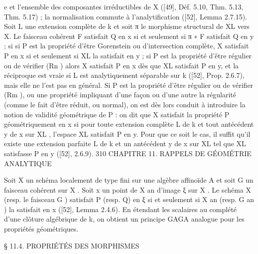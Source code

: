 \documentclass[
  10pt,
]{article}
\newenvironment{Shaded}{}{}
\newcommand{\NormalTok}[1]{#1}
\begin{document}
\begin{Shaded}
\begin{Highlighting}[]
\NormalTok{                                e et l’ensemble des composantes irréductibles de X ([49],}
\NormalTok{Déf. 5.10, Thm. 5.13, Thm. 5.17) ; la normalisation commute à l’analytification ([52],}
\NormalTok{Lemma 2.7.15).}
\NormalTok{   Soit L une extension complète de k et soit π le morphisme structural de XL vers X.}
\NormalTok{Le faisceau cohérent F satisfait Q en x si et seulement si π ∗ F satisfait Q en y ; si si}
\NormalTok{P est la propriété d’être Gorenstein ou d’intersection complète, X satisfait P en x si et}
\NormalTok{seulement si XL la satisfait en y ; si P est la propriété d’être régulier ou de vérifier (Rn )}
\NormalTok{alors X satisfait P en x dès que XL satisfait P en y, et la réciproque est vraie si L est}
\NormalTok{analytiquement séparable sur k ([52], Prop. 2.6.7), mais elle ne l’est pas en général.}
\NormalTok{   Si P est la propriété d’être régulier ou de vérifier (Rm ), ou une propriété impliquant}
\NormalTok{d’une façon ou d’une autre la régularité (comme le fait d’être réduit, ou normal), on}
\NormalTok{est dès lors conduit à introduire la notion de validité géométrique de P : on dit que X}
\NormalTok{satisfait la propriété P géométriquement en x si pour toute extension complète L de k}
\NormalTok{et tout antécédent y de x sur XL , l’espace XL satisfait P en y. Pour que ce soit le cas, il}
\NormalTok{suffit qu’il existe une extension parfaite L de k et un antécédent y de x sur XL tel que}
\NormalTok{XL satisfasse P en y ([52], 2.6.9).}
\NormalTok{310                 CHAPITRE 11. RAPPELS DE GÉOMÉTRIE ANALYTIQUE}

\NormalTok{   Soit X un schéma localement de type fini sur une algèbre affinoïde A et soit G un}
\NormalTok{faisceau cohérent sur X . Soit x un point de X an d’image ξ sur X . Le schéma X (resp.}
\NormalTok{le faisceau G ) satisfait P (resp. Q) en ξ si et seulement si X an (resp. G an ) la satisfait en}
\NormalTok{x ([52], Lemma 2.4.6). En étendant les scalaires au complété d’une clôture algébrique}
\NormalTok{de k, on obtient un principe GAGA analogue pour les propriétés géométriques.}



\NormalTok{                   § 11.4. PROPRIÉTÉS DES MORPHISMES}


\end{Highlighting}
\end{Shaded}
\end{document}
